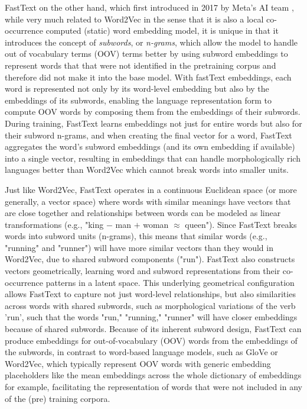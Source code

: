 \documentclass[final]{clv2025}
\begin{document}
FastText on the other hand, which first introduced in 2017 by Meta's AI team \cite{articleboja}, while very much related to Word2Vec in the sense that it is also a local co-occurrence computed (static) word embedding model, it is unique in that it introduces the concept of \textit{subwords}, or \textit{n-grams}, which allow the model to handle out of vocabulary terms (OOV) terms better by using subword embeddings to represent words that that were not identified in the pretraining corpus and therefore did not make it into the base model. With fastText embeddings, each word is represented not only by its word-level embedding but also by the embeddings of its subwords, enabling the language representation form to compute OOV words by composing them from the embeddings of their subwords. During training, FastText learns embeddings not just for entire words but also for their subword n-grams, and when creating the final vector for a word, FastText aggregates the word's subword embeddings (and its own embedding if available) into a single vector, resulting in embeddings that can handle morphologically rich languages better than Word2Vec which cannot break words into smaller units. 

Just like Word2Vec, FastText operates in a continuous Euclidean space (or more generally, a vector space) where words with similar meanings have vectors that are close together and relationships between words can be modeled as linear transformations (e.g., "king $-$ man $+$ woman $\approx$ queen"). Since FastText breaks words into subword units (n-grams), this means that similar words (e.g., "running" and "runner") will have more similar vectors than they would in Word2Vec, due to shared subword components ("run"). FastText also constructs vectors geometrically, learning word and subword representations from their co-occurrence patterns in a latent space. This underlying geometrical configuration allows FastText to capture not just word-level relationships, but also similarities across words with shared subwords, such as morphological variations of the verb 'run', such that the words "run," "running," "runner" will have closer embeddings because of shared subwords. Because of its inherent subword design, FastText can produce embeddings for out-of-vocabulary (OOV) words from the embeddings of the subwords, in contrast to word-based language models, such as GloVe or Word2Vec, which typically represent OOV words with generic embedding placeholders like the mean embeddings across the whole dictionary of embeddings for example, facilitating the representation of words that were not included in any of the (pre) training corpora.
\end{document}
